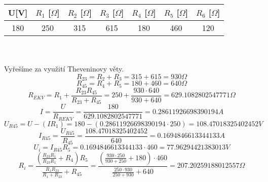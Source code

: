 \documentclass{article}
\begin{document}
\begin{tabular}{| c | c | c | c | c | c | c |}
  \hline
   U[V] & $R_{1}$ [$\Omega$] & $R_{2}$ [$\Omega$]& $R_{3}$ [$\Omega$]& $R_{4}$ [$\Omega$]& $R_{5}$ [$\Omega$]& $R_{6}$ [$\Omega$]\\
  \hline
  180 & 250 & 315 & 615 & 180 & 460 & 120\\
  \hline
\end{tabular}\\
\\
Vyřešíme za využití Theveninovy věty.\\
\[
  R_{23} = R_{2} + R_{3} = 315 + 615 = 930 \Omega
\]
\[
  R_{45} = R_4 + R_5 = 180 + 460 = 640 \Omega
\]
\[
  R_{EKV} = R_1 + \displaystyle\frac{R_{23}R_{45}}{R_{23}+R_{45}}
  = 250 + \displaystyle\frac{930 \cdot 640}{930 + 640}
  = 629.1082802547771 \Omega
\]
\[
  I = \displaystyle\frac{U}{R_{REKV}}
  = \displaystyle\frac{180}{629.1082802547771}
  = 0.28611926698390194A
\]
\[
  U_{R45} = U - (I R_1)
  = 180 - (0.28611926698390194\cdot 250)
  = 108.47018325402452 V
\]
\[
  I_{R45} = \displaystyle\frac{U_{R45}}{R_{45}}
  = \displaystyle\frac{108.47018325402452}{640}
  = 0.1694846613344133 A
\]
\[
  U_i = I_{R45} R_5
  = 0.1694846613344133 \cdot 460
  = 77.96294421383013 V
\]
\[
  R_i = \displaystyle\frac{(\displaystyle\frac{R_{23}R_{1}}{R_{23}R_1}+R_4)R_5}{
    \displaystyle\frac{R_1 R_{23}}{R_1 + R_{23}}+R_{45}
  }
  = \displaystyle\frac{(\displaystyle\frac{930\cdot 250}{930+250}+180)\cdot 460}{
    \displaystyle\frac{250 \cdot 930}{250 + 930}+640
  }
  = 207.20259188012557 \Omega
\]
\end{document}
